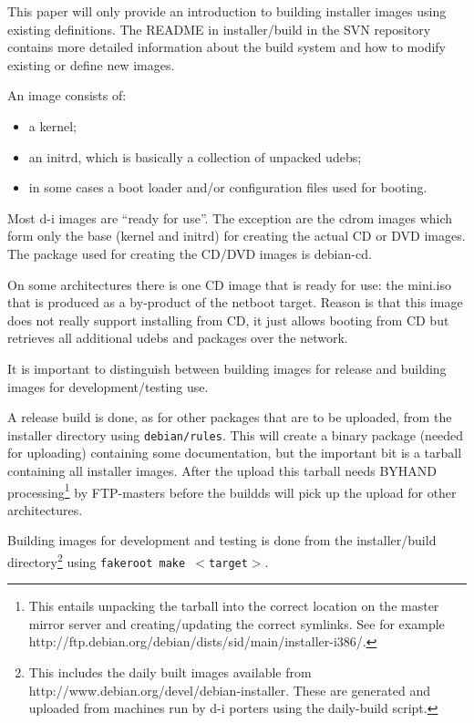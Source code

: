 \documentclass[a4paper,10pt]{article}
\begin{document}
This paper will only provide an introduction to building installer images using existing definitions. The README in installer/build in the SVN repository contains more detailed information about the build system and how to modify existing or define new images. 

An image consists of: 

\begin{itemize}
\item a kernel; 
\item an initrd, which is basically a collection of unpacked udebs; 
\item in some cases a boot loader and/or configuration files used for booting.
\end{itemize}

Most d-i images are “ready for use”. The exception are the cdrom images which form only the base (kernel and initrd) for creating the actual CD or DVD images. The package used for creating the CD/DVD images is debian-cd. 

On some architectures there is one CD image that is ready for use: the mini.iso that is produced as a by-product of the netboot target. Reason is that this image does not really support installing from CD, it just allows booting from CD but retrieves all additional udebs and packages over the network. 

It is important to distinguish between building images for release and building images for development/testing use. 

A release build is done, as for other packages that are to be uploaded, from the installer directory using \texttt{debian/rules}. This will create a binary package (needed for uploading) containing some documentation, but the important bit is a tarball containing all installer images. After the upload this tarball needs BYHAND processing\footnote{This entails unpacking the tarball into the correct location on the master mirror server and creating/updating the correct symlinks. See for example http://ftp.debian.org/debian/dists/sid/main/installer-i386/.} by FTP-masters before the buildds will pick up the upload for other architectures. 

Building images for development and testing is done from the installer/build directory\footnote{This includes the daily built images available from http://www.debian.org/devel/debian-installer. These are generated and uploaded from machines run by d-i porters using the daily-build script.} using \texttt{fakeroot make $<$target$>$}. 
\end{document}
